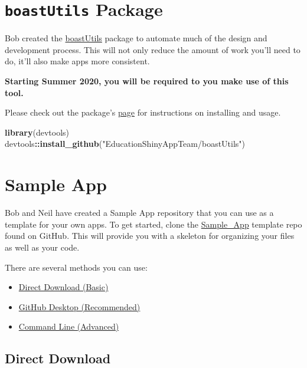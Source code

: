 \documentclass[
]{book}
\newenvironment{Shaded}{\begin{snugshade}}{\end{snugshade}}
\newcommand{\KeywordTok}[1]{\textcolor[rgb]{0.13,0.29,0.53}{\textbf{#1}}}
\newcommand{\NormalTok}[1]{#1}
\newcommand{\OperatorTok}[1]{\textcolor[rgb]{0.81,0.36,0.00}{\textbf{#1}}}
\newcommand{\StringTok}[1]{\textcolor[rgb]{0.31,0.60,0.02}{#1}}
\providecommand{\tightlist}{%
  \setlength{\itemsep}{0pt}\setlength{\parskip}{0pt}}
\begin{document}
\hypertarget{boastutils-package}{%
\section{\texorpdfstring{\texttt{boastUtils} Package}{boastUtils Package}}\label{boastutils-package}}

Bob created the \href{https://github.com/EducationShinyAppTeam/boastUtils}{boastUtils} package to automate much of the design and development process. This will not only reduce the amount of work you'll need to do, it'll also make apps more consistent.

\textbf{Starting Summer 2020, you will be required to you make use of this tool.}

Please check out the package's \href{https://github.com/EducationShinyAppTeam/boastUtils}{page} for instructions on installing and usage.

\begin{Shaded}
\begin{Highlighting}[]
\KeywordTok{library}\NormalTok{(devtools)}
\NormalTok{devtools}\OperatorTok{::}\KeywordTok{install_github}\NormalTok{(}\StringTok{"EducationShinyAppTeam/boastUtils"}\NormalTok{)}
\end{Highlighting}
\end{Shaded}

\hypertarget{sample-app}{%
\section{Sample App}\label{sample-app}}

Bob and Neil have created a Sample App repository that you can use as a template for your own apps. To get started, clone the \href{https://github.com/EducationShinyAppTeam/Sample_App}{Sample\_App} template repo found on GitHub. This will provide you with a skeleton for organizing your files as well as your code.

There are several methods you can use:

\begin{itemize}
\tightlist
\item
  \protect\hyperlink{direct-download}{Direct Download (Basic)}
\item
  \protect\hyperlink{github-desktop}{GitHub Desktop (Recommended)}
\item
  \protect\hyperlink{command-line}{Command Line (Advanced)}
\end{itemize}

\hypertarget{direct-download}{%
\subsection{Direct Download}\label{direct-download}}
\end{document}
